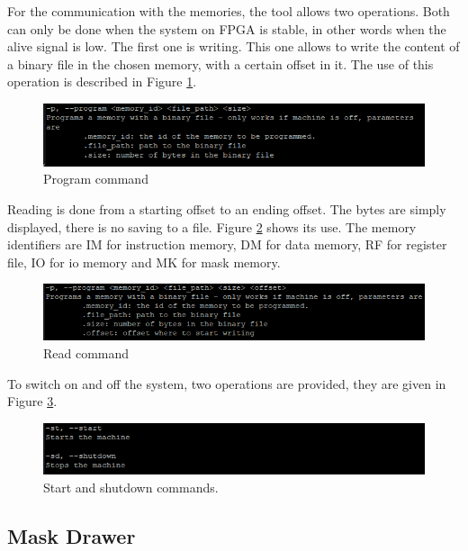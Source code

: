 For the communication with the memories, the tool allows two operations. Both can only be done 
when the system on FPGA is stable, in other words when the alive signal is low. The first one is 
writing. This one allows to write the content of a binary file in the chosen memory, with a certain 
offset in it. The use of this operation is described in Figure \ref{fig:tools/program}.

\begin{figure}[H]
    \centering
    \includegraphics[scale=1]{Chapter7-Tools-Demos/res/utils_program.PNG}
    \caption{Program command}
    \label{fig:tools/program}
\end{figure}

Reading is done from a starting 
offset to an ending offset. The bytes are simply displayed, there is no saving to a file. 
Figure \ref{fig:tools/read} shows its use. The memory identifiers are IM for 
instruction memory, DM for data memory, RF for register file, IO for io memory and MK for mask 
memory.

\begin{figure}[H]
    \centering
    \includegraphics[scale=1]{Chapter7-Tools-Demos/res/utils_read.PNG}
    \caption{Read command}
    \label{fig:tools/read}
\end{figure}

To switch on and off the system, two operations are provided, they are given in 
Figure \ref{fig:tools/st_sd}.

\begin{figure}[H]
    \centering
    \includegraphics[scale=1]{Chapter7-Tools-Demos/res/utils_power.PNG}
    \caption{Start and shutdown commands.}
    \label{fig:tools/st_sd}
\end{figure}

\subsection{Mask Drawer}


